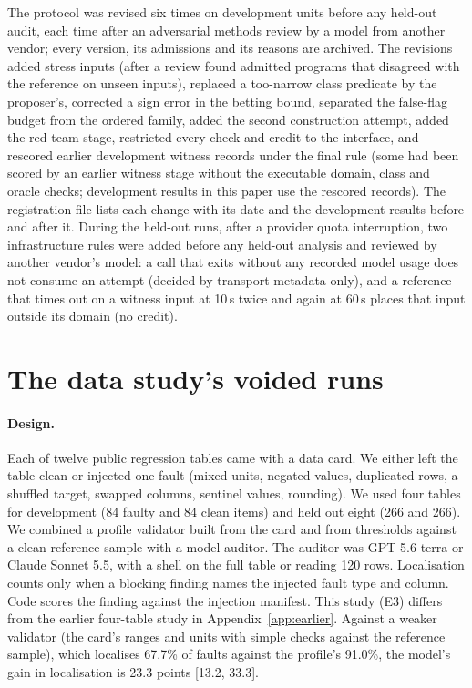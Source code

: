 The protocol was revised six times on development units before any held-out audit, each time after an
adversarial methods review by a model from another vendor; every version, its admissions and its reasons are
archived. The revisions added stress inputs (after a review found admitted programs that disagreed with the reference
on unseen inputs), replaced a too-narrow class predicate by the proposer's, corrected a sign error in the betting
bound, separated the false-flag budget from the ordered family, added the second construction attempt, added the
red-team stage, restricted every check and credit to the interface, and rescored earlier development witness records
under the final rule (some had been scored by an earlier witness stage without the executable domain, class and
oracle checks; development results in this paper use the rescored records). The registration file lists each change
with its date and the development results before and after it. During the held-out runs, after a provider quota interruption, two infrastructure rules were added before any
held-out analysis and reviewed by another vendor's model: a call that exits without any recorded model usage does
not consume an attempt (decided by transport metadata only), and a reference that times out on a witness input at
10\,s twice and again at 60\,s places that input outside its domain (no credit).

\section{The data study's voided runs}
\label{app:e3}

\paragraph{Design.} Each of twelve public regression tables came with a data card. We either left the table
clean or injected one fault (mixed units, negated values, duplicated rows, a shuffled target, swapped columns,
sentinel values, rounding). We used four tables for development (84 faulty and 84 clean items) and held out
eight (266 and 266). We combined a profile validator built from the card and from thresholds against a clean
reference sample with a model auditor. The auditor was GPT-5.6-terra or Claude Sonnet 5.5, with a shell on the
full table or reading 120 rows. Localisation counts only when a blocking finding names the injected fault type
and column. Code scores the finding against the injection manifest. This study (E3) differs from the earlier
four-table study in Appendix~\ref{app:earlier}. Against a weaker validator (the card's ranges and units with simple checks against the
reference sample), which localises 67.7\% of faults against the profile's 91.0\%, the model's gain in localisation
is 23.3 points [13.2, 33.3].

